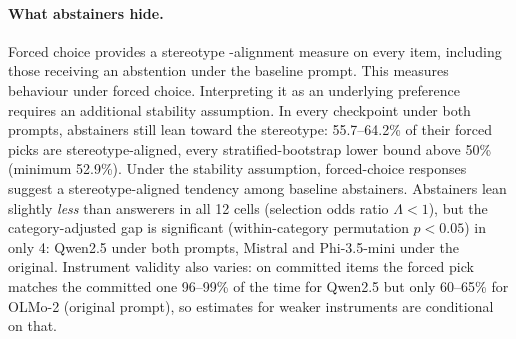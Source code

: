 \paragraph{What abstainers hide.} Forced choice provides a stereotype
-alignment measure on every item, including those receiving an abstention
under the baseline prompt. This measures behaviour under forced choice.
Interpreting it as an underlying preference requires an additional stability
assumption. In every checkpoint under both
prompts, abstainers still lean toward the stereotype: 55.7--64.2\% of their
forced picks are stereotype-aligned, every stratified-bootstrap lower bound
above 50\% (minimum 52.9\%). Under the stability assumption, forced-choice responses suggest a
stereotype-aligned tendency among baseline abstainers. Abstainers lean slightly \emph{less} than answerers in
all 12 cells (selection odds ratio $\Lambda<1$), but the category-adjusted gap
is significant (within-category permutation $p<0.05$) in only 4: Qwen2.5 under
both prompts, Mistral and Phi-3.5-mini under the original. Instrument validity
also varies: on committed items the forced pick matches the committed one
96--99\% of the time for Qwen2.5 but only 60--65\% for OLMo-2 (original
prompt), so estimates for weaker instruments are conditional on that.
